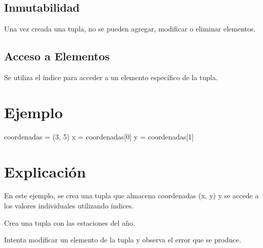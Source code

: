\documentclass[
  a4paper,
  onepage,
  openany]{scrreprt}
\newenvironment{Shaded}{\begin{snugshade}}{\end{snugshade}}
\newcommand{\DecValTok}[1]{\textcolor[rgb]{0.68,0.00,0.00}{#1}}
\newcommand{\NormalTok}[1]{\textcolor[rgb]{0.00,0.23,0.31}{#1}}
\newcommand{\OperatorTok}[1]{\textcolor[rgb]{0.37,0.37,0.37}{#1}}
\begin{document}
\hypertarget{inmutabilidad}{%
\subsection{Inmutabilidad}\label{inmutabilidad}}

Una vez creada una tupla, no se pueden agregar, modificar o eliminar
elementos.

\hypertarget{acceso-a-elementos-2}{%
\subsection{Acceso a Elementos}\label{acceso-a-elementos-2}}

Se utiliza el índice para acceder a un elemento específico de la tupla.

\hypertarget{ejemplo-20}{%
\section{Ejemplo}\label{ejemplo-20}}

\begin{Shaded}
\begin{Highlighting}[]
\NormalTok{coordenadas }\OperatorTok{=}\NormalTok{ (}\DecValTok{3}\NormalTok{, }\DecValTok{5}\NormalTok{)}
\NormalTok{x }\OperatorTok{=}\NormalTok{ coordenadas[}\DecValTok{0}\NormalTok{]}
\NormalTok{y }\OperatorTok{=}\NormalTok{ coordenadas[}\DecValTok{1}\NormalTok{]}
\end{Highlighting}
\end{Shaded}

\hypertarget{explicaciuxf3n-20}{%
\section{Explicación}\label{explicaciuxf3n-20}}

En este ejemplo, se crea una tupla que almacena coordenadas (x, y) y se
accede a los valores individuales utilizando índices.

\begin{tcolorbox}[enhanced jigsaw, breakable, opacityback=0, toptitle=1mm, coltitle=black, toprule=.15mm, rightrule=.15mm, colframe=quarto-callout-important-color-frame, opacitybacktitle=0.6, arc=.35mm, title=\textcolor{quarto-callout-important-color}{\faExclamation}\hspace{0.5em}{Actividad Práctica:}, titlerule=0mm, colbacktitle=quarto-callout-important-color!10!white, bottomtitle=1mm, bottomrule=.15mm, colback=white, left=2mm, leftrule=.75mm]

Crea una tupla con las estaciones del año.

Intenta modificar un elemento de la tupla y observa el error que se
produce.

\end{tcolorbox}
\end{document}
